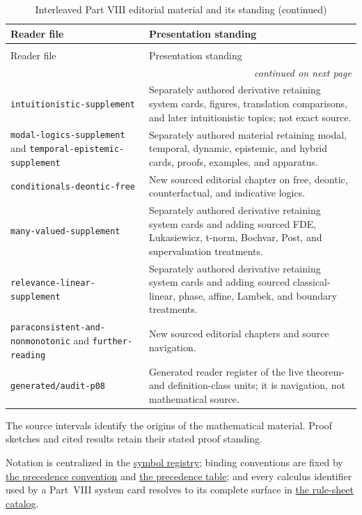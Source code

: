 \begin{longtable}{@{}p{}p{}@{}}
\caption{Interleaved Part VIII editorial material and its standing.}
\label{tab:p08-editorial-route}\\
\toprule
Reader file & Presentation standing \\
\midrule
\endfirsthead
\caption[]{Interleaved Part VIII editorial material and its standing (continued)}\\
\toprule
Reader file & Presentation standing \\
\midrule
\endhead
\midrule\multicolumn{2}{r}{\emph{continued on next page}}\\
\endfoot
\endlastfoot
\texttt{intuitionistic-supplement} &
Separately authored derivative retaining system cards, figures, translation
comparisons, and later intuitionistic topics; not exact source. \\
\texttt{modal-logics-supplement} and
\texttt{temporal-epistemic-supplement} &
Separately authored material retaining modal, temporal, dynamic, epistemic,
and hybrid cards, proofs, examples, and apparatus. \\
\texttt{conditionals-deontic-free} &
New sourced editorial chapter on free, deontic, counterfactual, and indicative
logics. \\
\texttt{many-valued-supplement} &
Separately authored derivative retaining system cards and adding sourced FDE,
Lukasiewicz, t-norm, Bochvar, Post, and supervaluation treatments. \\
\texttt{relevance-linear-supplement} &
Separately authored derivative retaining system cards and adding sourced
classical-linear, phase, affine, Lambek, and boundary treatments. \\
\texttt{paraconsistent-and-nonmonotonic} and \texttt{further-reading} &
New sourced editorial chapters and source navigation. \\
\texttt{generated/audit-p08} &
Generated reader register of the live theorem- and definition-class units; it
is navigation, not mathematical source. \\
\bottomrule
\end{longtable}

The source intervals identify the origins of the mathematical material.
Proof sketches and cited results retain their stated proof standing.

Notation is centralized in the
\hyperref[sec:p01-symbol-registry]{symbol registry}; binding conventions are
fixed by \hyperref[def:p01-w02-p01-026-precedence]{the precedence convention}
and \hyperref[tab:p01-precedence]{the precedence table}; and every
calculus identifier used by a Part~VIII system card resolves to its complete
surface in \hyperref[sec:p14-rule-sheets]{the rule-sheet catalog}.
